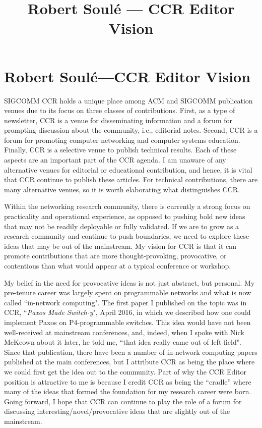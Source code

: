 \documentclass[11pt]{article}
\title{ Robert Soul\'{e} --- CCR Editor Vision}
\author{  }
\date{ }
\begin{document}
\thispagestyle{empty}

\section*{Robert Soul\'{e}---CCR Editor Vision}


SIGCOMM CCR holds a unique place among ACM and SIGCOMM publication venues due to its focus on three classes of contributions. First, as a type of newsletter, CCR is a venue for disseminating information and a forum for prompting discussion about the community, i.e., editorial notes. Second, CCR is a forum for promoting computer networking and computer systems education. Finally, CCR is a selective venue to publish technical results. Each of these aspects are an important part of the CCR agenda. I am unaware of any alternative venues for editorial or educational contribution, and hence, it is vital that CCR continue to publish these articles. For technical contributions, there are many alternative venues, so it is worth elaborating what distinguishes CCR. 

Within the networking research community, there is currently a strong focus on practicality and operational experience, as opposed to pushing bold new ideas that may not be readily deployable or fully validated. If we are to grow as a research community and continue to push boundaries, we need to explore these ideas that may be out of the mainstream. My vision for CCR is that it can promote contributions that are more thought-provoking, provocative, or contentious than what would appear at a typical conference or workshop. 

My belief in the need for provocative ideas is not just abstract, but personal. My pre-tenure career was largely spent on programmable networks and what is now called ``in-network computing". The first paper I published on the topic was in CCR, ``\emph{Paxos Made Switch-y}", April 2016, in which we described how one could implement Paxos on P4-programmable switches. This idea would have not been well-received at mainstream conferences, and, indeed, when I spoke with Nick McKeown about it later, he told me, ``that idea really came out of left field". Since that publication, there have been a number of in-network computing papers published at the main conferences, but I attribute CCR as being the place where we could first get the idea out to the community. Part of why the CCR Editor position is attractive to me is because I credit CCR as being the “cradle” where many of the ideas that formed the foundation for my research career were born. Going forward, I hope that CCR can continue to play the role of a forum for discussing interesting/novel/provocative ideas that are slightly out of the mainstream. 
\end{document}

